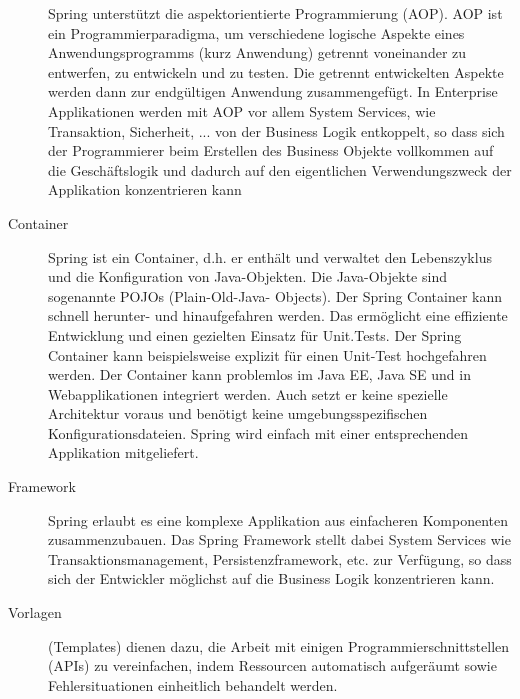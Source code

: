 \documentclass[a4paper,10pt]{scrreprt}
\begin{document}
\begin{description}
Spring unterstützt die aspektorientierte Programmierung (AOP). AOP ist ein
Programmierparadigma, um verschiedene logische Aspekte eines Anwendungsprogramms (kurz
Anwendung) getrennt voneinander zu entwerfen, zu entwickeln und zu testen. Die getrennt
entwickelten Aspekte werden dann zur endgültigen Anwendung zusammengefügt. In Enterprise
Applikationen werden mit AOP vor allem System Services, wie Transaktion, Sicherheit, ... von der
Business Logik entkoppelt, so dass sich der Programmierer beim Erstellen des Business Objekte
vollkommen auf die Geschäftslogik und dadurch auf den eigentlichen Verwendungszweck der
Applikation konzentrieren kann
\item [Container] Spring ist ein Container, d.h. er enthält und verwaltet den Lebenszyklus und die
Konfiguration von Java-Objekten. Die Java-Objekte sind sogenannte POJOs (Plain-Old-Java-
Objects). Der Spring Container kann schnell herunter- und hinaufgefahren werden. Das ermöglicht
eine effiziente Entwicklung und einen gezielten Einsatz für Unit.Tests. Der Spring Container kann
beispielsweise explizit für einen Unit-Test hochgefahren werden. Der Container kann problemlos im
Java EE, Java SE und in Webapplikationen integriert werden. Auch setzt er keine spezielle
Architektur voraus und benötigt keine umgebungsspezifischen Konfigurationsdateien. Spring wird
einfach mit einer entsprechenden Applikation mitgeliefert.
\item [Framework] Spring erlaubt es eine komplexe Applikation aus einfacheren Komponenten
zusammenzubauen. Das Spring Framework stellt dabei System Services wie
Transaktionsmanagement, Persistenzframework, etc. zur Verfügung, so dass sich der Entwickler
möglichst auf die Business Logik konzentrieren kann.
\item [Vorlagen] (Templates) dienen dazu, die Arbeit mit einigen Programmierschnittstellen (APIs) zu
vereinfachen, indem Ressourcen automatisch aufgeräumt sowie Fehlersituationen einheitlich
behandelt werden.

\end{description}
\end{document}
